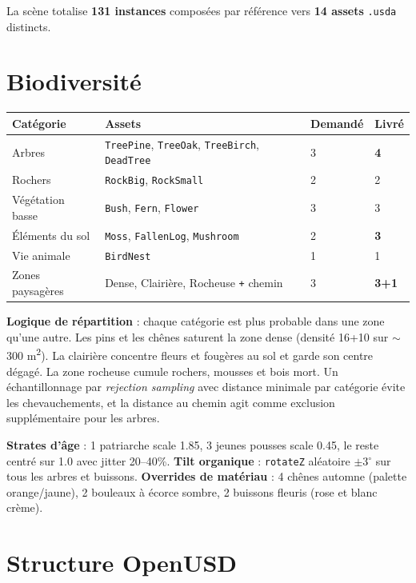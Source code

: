 \documentclass[11pt,a4paper]{article}
\begin{document}
La scène totalise \textbf{131 instances} composées par référence vers \textbf{14 assets} \texttt{.usda} distincts.

\section{Biodiversité}

\renewcommand{\arraystretch}{1.05}
\begin{tabularx}{\linewidth}{lXll}
\toprule
\textbf{Catégorie} & \textbf{Assets} & \textbf{Demandé} & \textbf{Livré} \\
\midrule
Arbres                 & \texttt{TreePine}, \texttt{TreeOak}, \texttt{TreeBirch}, \texttt{DeadTree} & 3 & \textbf{4} \\
Rochers                & \texttt{RockBig}, \texttt{RockSmall}                      & 2 & 2 \\
Végétation basse       & \texttt{Bush}, \texttt{Fern}, \texttt{Flower}             & 3 & 3 \\
Éléments du sol        & \texttt{Moss}, \texttt{FallenLog}, \texttt{Mushroom}      & 2 & \textbf{3} \\
Vie animale            & \texttt{BirdNest}                                          & 1 & 1 \\
Zones paysagères       & Dense, Clairière, Rocheuse \texttt{+} chemin               & 3 & \textbf{3+1} \\
\bottomrule
\end{tabularx}

\textbf{Logique de répartition} : chaque catégorie est plus probable dans une zone qu'une autre. Les pins et les chênes saturent la zone dense (densité 16+10 sur $\sim$300 m\textsuperscript{2}). La clairière concentre fleurs et fougères au sol et garde son centre dégagé. La zone rocheuse cumule rochers, mousses et bois mort. Un échantillonnage par \emph{rejection sampling} avec distance minimale par catégorie évite les chevauchements, et la distance au chemin agit comme exclusion supplémentaire pour les arbres.

\textbf{Strates d'âge} : 1 patriarche scale 1.85, 3 jeunes pousses scale 0.45, le reste centré sur 1.0 avec jitter 20--40\%. \textbf{Tilt organique} : \texttt{rotateZ} aléatoire $\pm$3$^{\circ}$ sur tous les arbres et buissons. \textbf{Overrides de matériau} : 4 chênes automne (palette orange/jaune), 2 bouleaux à écorce sombre, 2 buissons fleuris (rose et blanc crème).

\section{Structure OpenUSD}
\end{document}

